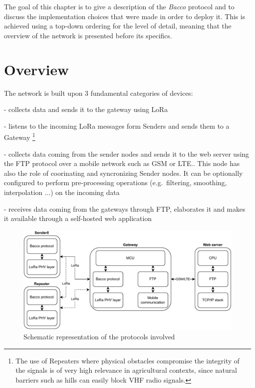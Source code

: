 The goal of this chapter is to give a description of the \textit{Bacco} protocol and to discuss the
implementation choices that were made in order to deploy it. This is achieved using a top-down ordering for the level
of detail, meaning that the overview of the network is presented before its specifics.

\section{Overview}
The network is built upon 3 fundamental categories of devices:

\begin{description}[font=$\bullet$~\normalfont\scshape\color{blue!50!black}]
    \item [Sender node] - collects data and sends it to the gateway using LoRa
    \item [Repeater node] - listens to the incoming LoRa messages form Senders and sends them to a Gateway \footnote{The use of Repeaters where
physical obstacles compromise the integrity of the signals is of very high
relevance in agricultural contexts, since natural barriers such as hills can easily block \gls{VHF} radio signals.}
    \item [Gateway node] - collects data coming from the sender nodes and sends it to the web server using the FTP
        protocol over a mobile network such as \gls{GSM} or \gls{LTE}.. This node has
        also the role of coorinating and syncronizing Sender nodes. It can be optionally configured to perform pre-processing operations (e.g.\ filtering, smoothing, interpolation ...) on the incoming data
    \item [Web server] - receives data coming from the gateways through FTP, elaborates it and makes it available
        through a self-hosted web application
\end{description}

\begin{figure}[ht]
    \centering
    \includegraphics[width=1.0\textwidth]{uml/network_stack.pdf}
    \caption{Schematic representation of the protocols involved}
    \label{network stack img}
\end{figure}

